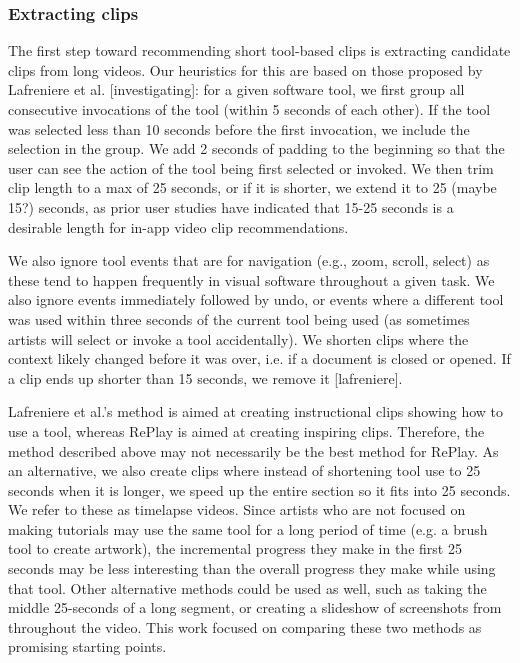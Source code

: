 \subsubsection{Extracting clips}
The first step toward recommending short tool-based clips is extracting candidate clips from long videos. Our heuristics for this are based on those proposed by Lafreniere et al. [investigating]: for a given software tool, we first group all consecutive invocations of the tool (within 5 seconds of each other). If the tool was selected less than 10 seconds before the first invocation, we include the selection in the group. We add 2 seconds of padding to the beginning so that the user can see the action of the tool being first selected or invoked. We then trim clip length to a max of 25 seconds, or if it is shorter, we extend it to 25 (maybe 15?) seconds, as prior user studies have indicated that 15-25 seconds is a desirable length for in-app video clip recommendations.

We also ignore tool events that are for navigation (e.g., zoom, scroll, select) as these tend to happen frequently in visual software throughout a given task. We also ignore events immediately followed by undo, or events where a different tool was used within three seconds of the current tool being used (as sometimes artists will select or invoke a tool accidentally). We shorten clips where the context likely changed before it was over, i.e. if a document is closed or opened. If a clip ends up shorter than 15 seconds, we remove it [lafreniere].

Lafreniere et al.'s method is aimed at creating instructional clips showing how to use a tool, whereas RePlay is aimed at creating inspiring clips. Therefore, the method described above may not necessarily be the best method for RePlay. As an alternative, we also create clips where instead of shortening tool use to 25 seconds when it is longer, we speed up the entire section so it fits into 25 seconds. We refer to these as timelapse videos. Since artists who are not focused on making tutorials may use the same tool for a long period of time (e.g. a brush tool to create artwork), the incremental progress they make in the first 25 seconds may be less interesting than the overall progress they make while using that tool. Other alternative methods could be used as well, such as taking the middle 25-seconds of a long segment, or creating a slideshow of screenshots from throughout the video. This work focused on comparing these two methods as promising starting points.

